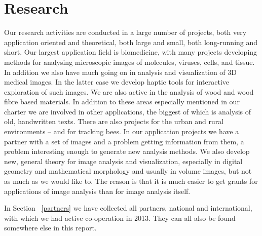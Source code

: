 \section{Research}\label{research}
\label{research_proj}
{\large
Our research activities are conducted in a large number of projects, both very application oriented and theoretical, both large and small, both long-running and short. Our largest application field is biomedicine, with many projects developing methods for analysing microscopic images of molecules, viruses, cells, and tissue. In addition we also have much going on in analysis and visualization of 3D medical images. In the latter case we develop haptic tools for interactive exploration of such images. We are also active in the analysis of wood and wood fibre based materials. In addition to these areas especially mentioned in our charter we are involved in other applications, the biggest of which is analysis of old, handwritten texts. There are also projects for the urban and rural environments -- and for tracking bees. In our application projects we have a partner with a set of images and a problem getting information from them, a problem interesting enough to generate new analysis methods. We also develop new, general theory for image analysis and visualization, especially in digital geometry and mathematical morphology and usually in volume images, but not as much as we would like to. The reason is that it is much easier to get grants for applications of image analysis than for image analysis itself.

In Section ~\ref{partners} we have collected all partners, national and international, with which we had active co-operation in 2013. They can all also be found somewhere else in this report.}
\vfill

